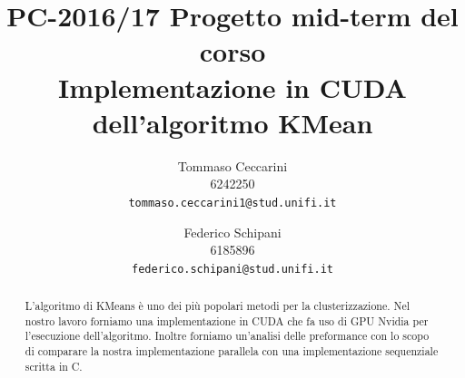 \documentclass[10pt,twocolumn,letterpaper]{article}
\begin{document}
\title{PC-2016/17 Progetto mid-term del corso \\
Implementazione in CUDA dell'algoritmo KMean}

\author{Tommaso Ceccarini \\
6242250\\
{\tt\small tommaso.ceccarini1@stud.unifi.it}
\and
Federico Schipani\\
6185896\\
{\tt\small federico.schipani@stud.unifi.it}
}

\maketitle
\thispagestyle{empty}

\begin{abstract}
	L'algoritmo di KMeans è uno dei più popolari metodi per la clusterizzazione. Nel nostro lavoro forniamo una implementazione in CUDA che fa uso 
	di GPU Nvidia per l'esecuzione dell'algoritmo. Inoltre forniamo un'analisi delle preformance con lo scopo di comparare la nostra implementazione parallela con una implementazione sequenziale scritta in C.
\end{abstract}

\end{document}
